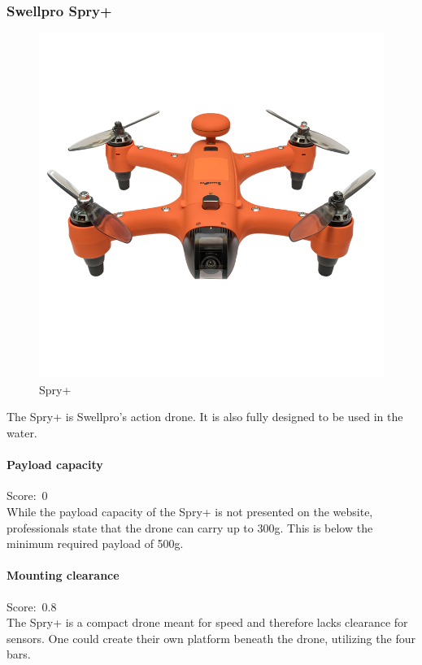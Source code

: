 \newpage
\subsubsection{Swellpro Spry+}
\begin{figure}
\includegraphics[width=1\linewidth]{uav/models/21_spry.png}
\caption{Spry+}
\end{figure}
The Spry+ \cite{spry} is Swellpro's action drone. It is also fully designed to be used in the water.

\paragraph{Payload capacity}\mbox{Score: 0} \\
While the payload capacity of the Spry+ is not presented on the website, professionals state that the drone can carry up to 300g\cite{sprypayload}. This is below the minimum required payload of 500g.

\paragraph{Mounting clearance}\mbox{Score: 0.8} \\
The Spry+ is a compact drone meant for speed and therefore lacks clearance for sensors. One could create their own platform beneath the drone, utilizing the four bars.

